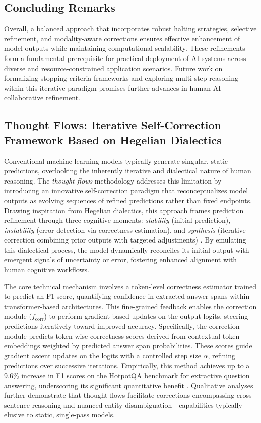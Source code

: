 \documentclass[sigconf]{acmart}
\begin{document}
\subsection{Concluding Remarks}
Overall, a balanced approach that incorporates robust halting strategies, selective refinement, and modality-aware corrections ensures effective enhancement of model outputs while maintaining computational scalability. These refinements form a fundamental prerequisite for practical deployment of AI systems across diverse and resource-constrained application scenarios. Future work on formalizing stopping criteria frameworks and exploring multi-step reasoning within this iterative paradigm promises further advances in human-AI collaborative refinement.

\subsection{Thought Flows: Iterative Self-Correction Framework Based on Hegelian Dialectics}

Conventional machine learning models typically generate singular, static predictions, overlooking the inherently iterative and dialectical nature of human reasoning. The \emph{thought flows} methodology addresses this limitation by introducing an innovative self-correction paradigm that reconceptualizes model outputs as evolving sequences of refined predictions rather than fixed endpoints. Drawing inspiration from Hegelian dialectics, this approach frames prediction refinement through three cognitive moments: \textit{stability} (initial prediction), \textit{instability} (error detection via correctness estimation), and \textit{synthesis} (iterative correction combining prior outputs with targeted adjustments) \cite{ref43}. By emulating this dialectical process, the model dynamically reconciles its initial output with emergent signals of uncertainty or error, fostering enhanced alignment with human cognitive workflows.

The core technical mechanism involves a token-level correctness estimator trained to predict an F1 score, quantifying confidence in extracted answer spans within transformer-based architectures. This fine-grained feedback enables the correction module ($f_{\text{corr}}$) to perform gradient-based updates on the output logits, steering predictions iteratively toward improved accuracy. Specifically, the correction module predicts token-wise correctness scores derived from contextual token embeddings weighted by predicted answer span probabilities. These scores guide gradient ascent updates on the logits with a controlled step size $\alpha$, refining predictions over successive iterations. Empirically, this method achieves up to a 9.6\% increase in F1 scores on the HotpotQA benchmark for extractive question answering, underscoring its significant quantitative benefit \cite{ref43}. Qualitative analyses further demonstrate that thought flows facilitate corrections encompassing cross-sentence reasoning and nuanced entity disambiguation—capabilities typically elusive to static, single-pass models.
\end{document}
